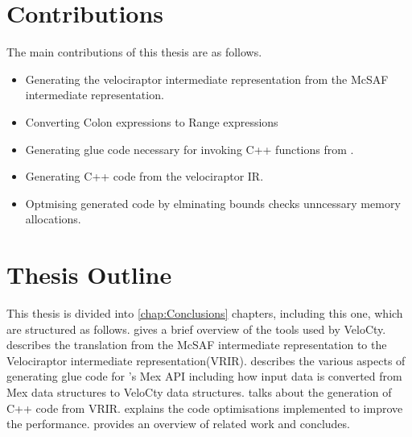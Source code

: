 \section{Contributions}
The main contributions of this thesis are as follows.
\begin{itemize}
\item Generating the velociraptor intermediate representation from the McSAF intermediate representation. 
\item Converting Colon expressions to Range expressions
\item Generating glue code necessary for invoking C++ functions from \matlab.
\item Generating C++ code from the velociraptor IR.
\item Optmising generated code by elminating bounds checks unncessary memory allocations. 
\end{itemize}
\section{Thesis Outline}
This thesis is divided into \ref{chap:Conclusions} chapters, including this one, which are structured as follows.
 gives a brief overview of the tools
used by VeloCty.
 describes the translation from the McSAF  
intermediate representation to the Velociraptor intermediate representation(VRIR).
 describes the various aspects of generating glue code for \matlab's Mex API including how input data is converted from Mex data structures to VeloCty data structures. 
 talks about the generation of C++ code from VRIR.
 explains the code optimisations implemented to improve the performance. 
 provides an overview of related work and
 concludes.
